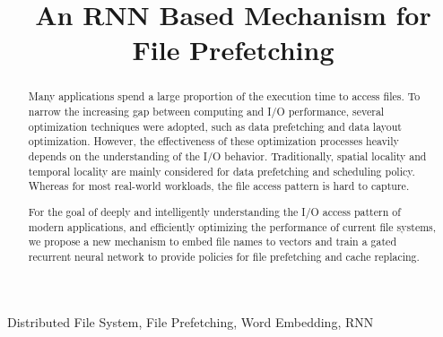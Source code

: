 \documentclass[conference]{IEEEtran}
\begin{document}
\title{An RNN Based Mechanism for File Prefetching \\
}
\author{
}

\maketitle

\begin{abstract}
Many applications spend a large proportion of the execution time to access files. To narrow the increasing gap between computing and I/O performance, several optimization techniques were adopted, such as data prefetching and data layout optimization. However, the effectiveness of these optimization processes heavily depends on the understanding of the I/O behavior. Traditionally, spatial locality and temporal locality are mainly considered for data prefetching and scheduling policy. Whereas for most real-world workloads, the file access pattern is hard to capture. 

For the goal of deeply and intelligently understanding the I/O access pattern of modern applications, and efficiently optimizing the performance of current file systems, we propose a new mechanism to embed file names to vectors and train a gated recurrent neural network to provide policies for file prefetching and cache replacing.
\end{abstract}

\begin{IEEEkeywords}
    Distributed File System, File Prefetching, Word Embedding, RNN

\end{IEEEkeywords}
\end{document}
